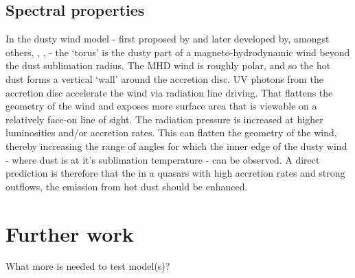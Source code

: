 \subsection{Spectral properties}

In the dusty wind model - first proposed by \citet{konigl94} and later developed by, amongst others, \citet{everett05}, \citet{elitzur06}, \citet{keating12} - the `torus' is the dusty part of a magneto-hydrodynamic wind beyond the dust sublimation radius. 
The MHD wind is roughly polar, and so the hot dust forms a vertical `wall' around the accretion disc.  
UV photons from the accretion disc accelerate the wind via radiation line driving. 
That flattens the geometry of the wind and exposes more surface area that is viewable on a relatively face-on line of sight.  
The radiation pressure is increased at higher luminosities and/or accretion rates.
This can flatten the geometry of the wind, thereby increasing the range of angles for which the inner edge of the dusty wind - where dust is at it's sublimation temperature - can be observed. 
A direct prediction is therefore that the in a quasars with high accretion rates and strong outflows, the emission from hot dust should be enhanced. 


\section{Further work}

What more is needed to test model(s)?  